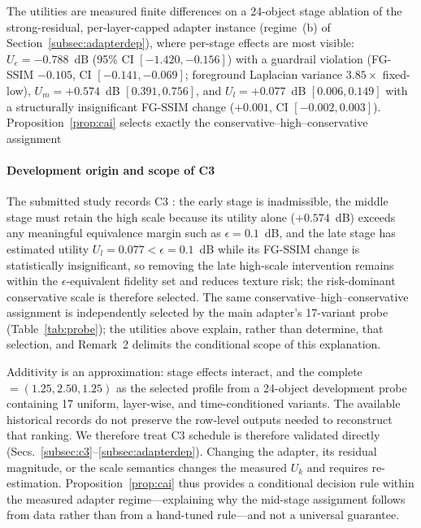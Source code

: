 \documentclass[times,twocolumn,final]{elsarticle}
\providecommand{\DIFadd}[1]{{\protect\color{blue} \sf #1}} %
\providecommand{\DIFdel}[1]{{\protect\color{red} \scriptsize #1}} %
\providecommand{\DIFaddbegin}{} %
\providecommand{\DIFaddend}{} %
\providecommand{\DIFdelbegin}{} %
\providecommand{\DIFdelend}{} %
\begin{document}
\DIFdelbegin %
\DIFdel{The utilities are measured finite differences on a 24-object stage ablation of the strong-residual, per-layer-capped adapter instance (regime~(b) of Section~\ref{subsec:adapterdep}), where per-stage effects are most visible: $U_e=-0.788$~dB (95\% CI $[-1.420,-0.156]$) with a guardrail violation (FG-SSIM $-0.105$, CI $[-0.141,-0.069]$; foreground Laplacian variance $3.85\times$ fixed-low), $U_m=+0.574$~dB $[0.391,0.756]$, and $U_l=+0.077$~dB $[0.006,0.149]$ with a structurally insignificant FG-SSIM change ($+0.001$, CI $[-0.002,0.003]$). Proposition~\ref{prop:cai} selects exactly the conservative--high--conservative assignment }\DIFdelend \DIFaddbegin \paragraph{Development origin and scope of C3}
\DIFadd{The submitted study records }\DIFaddend C3 \DIFdelbegin \DIFdel{: the early stage is inadmissible, the middle stage must retain the high scale because its utility alone ($+0.574$~dB) exceeds any meaningful equivalence margin such as $\epsilon=0.1$~dB, and the late stage has estimated utility $U_l=0.077<\epsilon=0.1$~dB while its FG-SSIM change is statistically insignificant, so removing the late high-scale intervention remains within the $\epsilon$-equivalent fidelity set and reduces texture risk; the risk-dominant conservative scale is therefore selected. The same conservative--high--conservative assignment is independently selected by the main adapter's 17-variant probe (Table~\ref{tab:probe}); the utilities above explain, rather than determine, that selection, and Remark~2 delimits the conditional scope of this explanation.
}%

\DIFdel{Additivity is an approximation: stage effects interact, and the complete }\DIFdelend \DIFaddbegin \DIFadd{$=(1.25,2.50,1.25)$ as the selected profile from a 24-object development probe containing 17 uniform, layer-wise, and time-conditioned variants. The available historical records do not preserve the row-level outputs needed to reconstruct that ranking. We therefore treat }\DIFaddend C3 \DIFdelbegin \DIFdel{schedule is therefore validated directly (Secs.~\ref{subsec:c3}--\ref{subsec:adapterdep}). Changing the adapter, its residual magnitude, or the scale semantics changes the measured $U_k$ and requires re-estimation. Proposition~\ref{prop:cai} thus provides a conditional decision rule within the measured adapter regime---explaining why the mid-stage assignment follows from data rather than from a hand-tuned rule---and not a universal guarantee.
}%
\end{document}
